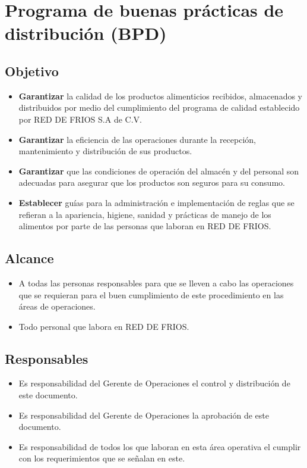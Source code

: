 \renewcommand{\Codigo}{BPD-PROG}
\renewcommand{\FechaPub}{2023-01}
\renewcommand{\Edit}{2.1}
\renewcommand{\Titulo}{Programa de buenas prácticas de distribución (BPD)}

\section{\Titulo}

\subsection{Objetivo}

\begin{itemize}
	\item \textbf{Garantizar} la calidad de los productos alimenticios recibidos, almacenados y distribuidos por medio del cumplimiento del programa de calidad establecido por RED DE FRIOS S.A de C.V.
	\item \textbf{Garantizar} la eficiencia de las operaciones durante la recepción, mantenimiento y distribución de sus productos.
	\item \textbf{Garantizar} que las condiciones de operación del almacén y del personal son adecuadas para asegurar que los productos son seguros para su consumo.
	\item \textbf{Establecer} guías para la administración e implementación de reglas que se refieran a la apariencia, higiene, sanidad y prácticas de manejo de los alimentos por parte de las personas que laboran en RED DE FRIOS.
\end{itemize}

\subsection{Alcance}

\begin{itemize}
	\item A todas las personas responsables para que se lleven a cabo las operaciones que se requieran para el buen cumplimiento de este procedimiento en las áreas de operaciones.
	\item Todo personal que labora en RED DE FRIOS.
\end{itemize}

\subsection{Responsables}

\begin{itemize}
	\item Es responsabilidad del Gerente de Operaciones el control y distribución de este documento.
	\item Es responsabilidad del Gerente de Operaciones la aprobación de este documento.
	\item Es responsabilidad de todos los que laboran en esta área operativa el cumplir con los requerimientos que se señalan en este.
\end{itemize}

